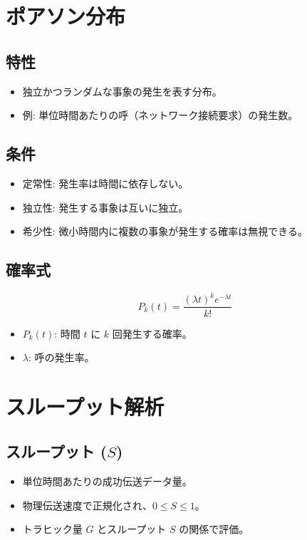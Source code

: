 \documentclass[a4paper,12pt]{ltjsarticle}
\begin{document}
\section{ポアソン分布}

\subsection*{特性}
\begin{itemize}
    \item 独立かつランダムな事象の発生を表す分布。
    \item 例: 単位時間あたりの呼（ネットワーク接続要求）の発生数。
\end{itemize}

\subsection*{条件}
\begin{itemize}
    \item 定常性: 発生率は時間に依存しない。
    \item 独立性: 発生する事象は互いに独立。
    \item 希少性: 微小時間内に複数の事象が発生する確率は無視できる。
\end{itemize}

\subsection*{確率式}
\[
P_k(t) = \frac{(\lambda t)^k e^{-\lambda t}}{k!}
\]
\begin{itemize}
    \item \( P_k(t) \): 時間 \( t \) に \( k \) 回発生する確率。
    \item \( \lambda \): 呼の発生率。
\end{itemize}

\section{スループット解析}

\subsection*{スループット (\( S \))}
\begin{itemize}
    \item 単位時間あたりの成功伝送データ量。
    \item 物理伝送速度で正規化され、\( 0 \leq S \leq 1 \)。
    \item トラヒック量 \( G \) とスループット \( S \) の関係で評価。
\end{itemize}
\end{document}
